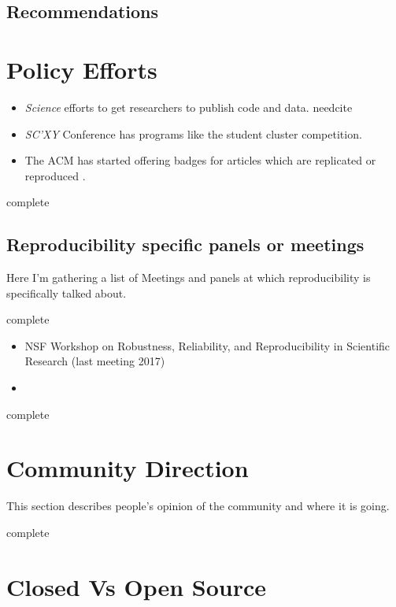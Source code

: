 \documentclass[american]{article}
\newcommand{\complete}{
	\gls{complete}
}
\newcommand{\needcite}{
	\gls{needcite}
}
\begin{document}
\subsection{Recommendations}

\section{Policy Efforts}

\begin{itemize}
\item \textit{Science} efforts to get researchers to publish code and data. \needcite
\item \textit{SC'XY} Conference has programs like the student cluster competition. \cite{sighpc-connect-repro-1,sighpc-connect-repro-2}
\item The ACM has started offering badges for articles which are replicated or reproduced \cite{acm-badging-announcement}.
\end{itemize}

\complete

\subsection{Reproducibility specific panels or meetings}

Here I'm gathering a list of Meetings and panels at which reproducibility is specifically talked about.

\complete

\begin{itemize}
\item NSF Workshop on Robustness, Reliability, and Reproducibility in Scientific Research (last meeting 2017)
\item 
\end{itemize}

\complete

\section{Community Direction}

This section describes people's opinion of the community and where it is going.

\complete

\section{Closed Vs Open Source}
\end{document}
